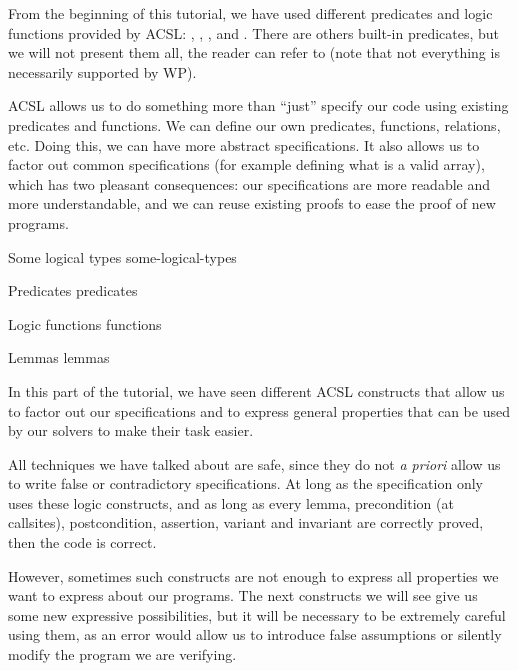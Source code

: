 From the beginning of this tutorial, we have used different predicates
and logic functions provided by ACSL: ,
, ,
 and . There are others
built-in predicates, but we will not present them all, the reader can refer to
(note that not everything is necessarily supported by WP).



ACSL allows us to do something more than ``just'' specify our code using
existing predicates and functions. We can define our own predicates,
functions, relations, etc. Doing this, we can have more abstract
specifications. It also allows us to factor out common specifications (for example
defining what is a valid array), which has two pleasant consequences:
our specifications are more readable and more understandable, and we can
reuse existing proofs to ease the proof of new programs.



\begin{levelTwo}
  {Some logical types}
  {some-logical-types}
\end{levelTwo}

\begin{levelTwo}
  {Predicates}
  {predicates}
\end{levelTwo}

\begin{levelTwo}
  {Logic functions}
  {functions}
\end{levelTwo}

\begin{levelTwo}
  {Lemmas}
  {lemmas}
\end{levelTwo}

\horizontalLine
\newpage

In this part of the tutorial, we have seen different ACSL constructs that
allow us to factor out our specifications and to express general properties
that can be used by our solvers to make their task easier.




All techniques we have talked about are safe, since they do not \emph{a
priori} allow us to write false or contradictory specifications. At
long as the specification only uses these logic constructs, and 
as long as every lemma, precondition (at callsites), postcondition,
assertion, variant and invariant are correctly proved, then the code is
correct.




However, sometimes such constructs are not enough to express all
properties we want to express about our programs. The next constructs
we will see give us some new expressive possibilities, but it will be
necessary to be extremely careful using them, as an error would allow us
to introduce false assumptions or silently modify the program we are
verifying.

